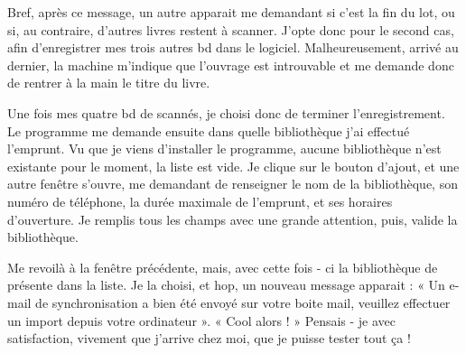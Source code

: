 Bref, après ce message, un autre apparait me demandant si c'est la fin du lot, ou si, au contraire, d'autres livres restent à scanner. 
J'opte donc pour le second cas, afin d'enregistrer mes trois autres bd dans le logiciel. 
Malheureusement, arrivé au dernier, la machine m'indique que l'ouvrage est introuvable et me demande donc de rentrer à la main le titre du livre. 

Une fois mes quatre bd de scannés, je choisi donc de terminer l'enregistrement. 
Le programme me demande ensuite dans quelle bibliothèque j'ai effectué l'emprunt. 
Vu que je viens d'installer le programme, aucune bibliothèque n'est existante pour le moment, la liste est vide.
Je clique sur le bouton d'ajout, et une autre fenêtre s'ouvre, me demandant de renseigner le nom de la bibliothèque, son numéro de téléphone, la durée maximale de l'emprunt, et ses horaires d'ouverture. 
Je remplis tous les champs avec une grande attention, puis, valide la bibliothèque. 

Me revoilà à la fenêtre précédente, mais, avec cette fois - ci la bibliothèque de présente dans la liste.
Je la choisi, et hop, un nouveau message apparait : « Un e-mail de synchronisation a bien été envoyé sur votre boite mail, veuillez effectuer un import depuis votre ordinateur ».
« Cool alors ! » Pensais - je avec satisfaction, vivement que j'arrive chez moi, que je puisse tester tout ça !
